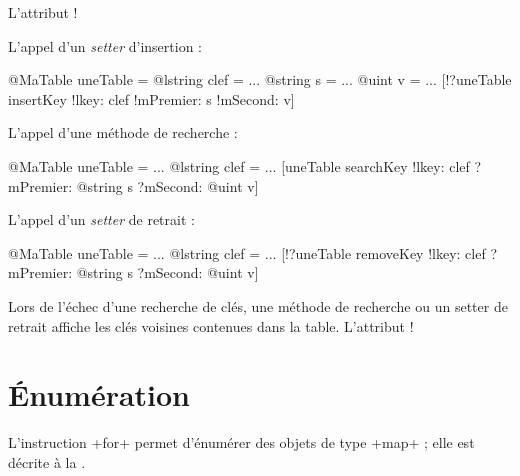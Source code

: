 L'attribut \ggs!%



L'appel d'un \emph{setter} d'insertion :
\begin{galgas}
@MaTable uneTable = {}
@lstring clef = ...
@string s = ...
@uint v = ...
[!?uneTable insertKey !lkey: clef !mPremier: s !mSecond: v]
\end{galgas}



L'appel d'une méthode de recherche :
\begin{galgas}
@MaTable uneTable = {}
...
@lstring clef = ...
[uneTable searchKey !lkey: clef ?mPremier: @string s ?mSecond: @uint v]
\end{galgas}


L'appel d'un \emph{setter} de retrait :
\begin{galgas}
@MaTable uneTable = {}
...
@lstring clef = ...
[!?uneTable removeKey !lkey: clef ?mPremier: @string s ?mSecond: @uint v]
\end{galgas}

Lors de l'échec d'une recherche de clés, une méthode de recherche ou un setter de retrait affiche les clés voisines contenues dans la table. L'attribut \ggs!%




\section{Énumération}

L'instruction \ggs+for+ permet d'énumérer des objets de type \ggs+map+ ; elle est décrite à la .

